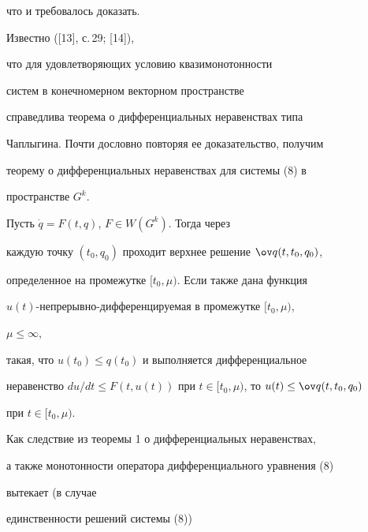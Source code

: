 что и требовалось доказать. 


\medskip 


 


Известно ([13], с.\,29; [14]), 


что для удовлетворяющих условию квазимонотонности 


систем в конечномерном векторном пространстве  


справедлива теорема о дифференциальных неравенствах типа  


Чаплыгина. Почти дословно повторяя ее доказательство, получим  


теорему о дифференциальных неравенствах для системы (8) в  


пространстве $G^k$. 


 


\begin{thm} 


Пусть $\Dot q=F(t,q)$, $F\in W(G^k)$. Тогда через  


каждую точку $(t_0,q_0)$ проходит верхнее решение $\ov q(t,t_0,q_0)$, 


определенное на промежутке $[t_0,\mu)$. Если также дана функция  


$u(t)$-непрерывно-дифференцируемая в промежутке $[t_0,\mu)$, 


$\mu\le\infty$, 


такая, что $u(t_0)\le q(t_0)$ и выполняется дифференциальное  


неравенство $du/dt\le F(t,u(t))$ при $t\in[t_0,\mu)$, то $u(t)\le\ov 


q(t,t_0,q_0)$ 


при $t\in[t_0,\mu)$. 


\end{thm} 


 


Как следствие из теоремы 1 о дифференциальных неравенствах, 


а также монотонности оператора дифференциального уравнения (8) 


вытекает (в случае 


единственности решений системы (8)) 


 


